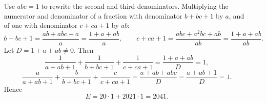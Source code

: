 Use $abc=1$ to rewrite the second and third denominators. Multiplying the numerator and denominator of a fraction with denominator $b+bc+1$ by $a$, and of one with denominator $c+ca+1$ by $ab$:
\[b+bc+1=\dfrac{ab+abc+a}{a}=\dfrac{1+a+ab}{a},\qquad c+ca+1=\dfrac{abc+a^2bc+ab}{ab}=\dfrac{1+a+ab}{ab}.\]
Let $D=1+a+ab\ne0$. Then
\[\dfrac1{a+ab+1}+\dfrac1{b+bc+1}+\dfrac1{c+ca+1}=\dfrac{1+a+ab}{D}=1,\]
\[\dfrac a{a+ab+1}+\dfrac b{b+bc+1}+\dfrac c{c+ca+1}=\dfrac{a+ab+abc}{D}=\dfrac{a+ab+1}{D}=1.\]
Hence
\[E=20\cdot1+2021\cdot1=\boxed{2041}.\]
